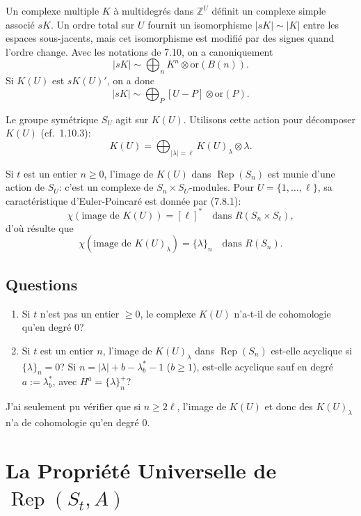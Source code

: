 \documentclass[11pt,a4paper]{article}
\theoremstyle{plain}
\theoremstyle{definition}
\DeclareMathOperator{\Rep}{Rep}
\newcommand{\Z}{\mathbb{Z}}
\begin{document}
Un complexe multiple $K$ \`a multidegr\'es dans $\Z^U$ d\'efinit un complexe simple associ\'e $sK$. Un ordre total sur $U$ fournit un isomorphisme $|sK| \sim |K|$ entre les espaces sous-jacents, mais cet isomorphisme est modifi\'e par des signes quand l'ordre change. Avec les notations de 7.10, on a canoniquement
\[
|sK| \sim \bigoplus_n K^n \otimes \text{or}(B(n)).
\]
Si $K(U)$ est $sK(U)'$, on a donc
\[
|sK| \sim \bigoplus_P [U - P] \otimes \text{or}(P).
\]

Le groupe sym\'etrique $S_U$ agit sur $K(U)$. Utilisons cette action pour d\'ecomposer $K(U)$ (cf.~1.10.3):
\[
K(U) = \bigoplus_{|\lambda| = \ell} K(U)_\lambda \otimes \lambda.
\]

Si $t$ est un entier $n \geq 0$, l'image de $K(U)$ dans $\Rep(S_n)$ est munie d'une action de $S_U$: c'est un complexe de $S_n \times S_U$-modules. Pour $U = \{1, \ldots, \ell\}$, sa caract\'eristique d'Euler-Poincar\'e est donn\'ee par (7.8.1):
\begin{equation}
\chi(\text{image de } K(U)) = [\ell]^* \quad \text{dans } R(S_n \times S_\ell), \tag{7.12.1}
\end{equation}
d'o\`u r\'esulte que
\begin{equation}
\chi(\text{image de } K(U)_\lambda) = \{\lambda\}_n \quad \text{dans } R(S_n). \tag{7.12.2}
\end{equation}

\subsection{Questions}
\begin{enumerate}[label=(\roman*)]
\item Si $t$ n'est pas un entier $\geq 0$, le complexe $K(U)$ n'a-t-il de cohomologie qu'en degr\'e $0$?
\item Si $t$ est un entier $n$, l'image de $K(U)_\lambda$ dans $\Rep(S_n)$ est-elle acyclique si $\{\lambda\}_n = 0$? Si $n = |\lambda| + b - \lambda^*_b - 1$ ($b \geq 1$), est-elle acyclique sauf en degr\'e $a := \lambda^*_b$, avec $H^a = \{\lambda\}^+_n$?
\end{enumerate}

J'ai seulement pu v\'erifier que si $n \geq 2\ell$, l'image de $K(U)$ et donc des $K(U)_\lambda$ n'a de cohomologie qu'en degr\'e $0$.


\section{La Propri\'et\'e Universelle de $\Rep(S_t, A)$}
\end{document}
